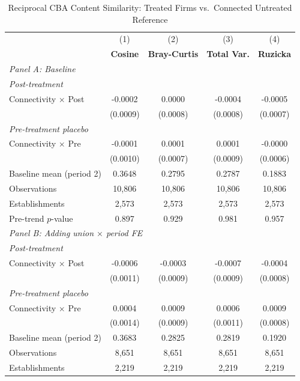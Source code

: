 \begin{table}[H]
\centering
\caption{Reciprocal CBA Content Similarity: Treated Firms vs.\ Connected Untreated Reference}
\label{tab:treated_cba_similarity}
\scriptsize
\setlength{\tabcolsep}{8pt}
\begin{tabular}{lcccc}
\toprule\toprule
 & (1) & (2) & (3) & (4) \\
 & \textbf{Cosine} & \textbf{Bray-Curtis} & \textbf{Total Var.} & \textbf{Ruzicka} \\
\midrule
\multicolumn{5}{l}{\textit{Panel A: Baseline}} \\
\multicolumn{5}{l}{\textit{Post-treatment}} \\
Connectivity $\times$ Post & -0.0002 & 0.0000 & -0.0004 & -0.0005 \\
 & (0.0009) & (0.0008) & (0.0008) & (0.0007) \\
\multicolumn{5}{l}{\textit{Pre-treatment placebo}} \\
Connectivity $\times$ Pre & -0.0001 & 0.0001 & 0.0001 & -0.0000 \\
 & (0.0010) & (0.0007) & (0.0009) & (0.0006) \\
\midrule
Baseline mean (period 2) & 0.3648 & 0.2795 & 0.2787 & 0.1883 \\
Observations &       10,806 &       10,806 &       10,806 &       10,806 \\
Establishments &        2,573 &        2,573 &        2,573 &        2,573 \\
Pre-trend $p$-value & 0.897 & 0.929 & 0.981 & 0.957 \\
\midrule
\multicolumn{5}{l}{\textit{Panel B: Adding union $\times$ period FE}} \\
\multicolumn{5}{l}{\textit{Post-treatment}} \\
Connectivity $\times$ Post & -0.0006 & -0.0003 & -0.0007 & -0.0004 \\
 & (0.0011) & (0.0009) & (0.0009) & (0.0008) \\
\multicolumn{5}{l}{\textit{Pre-treatment placebo}} \\
Connectivity $\times$ Pre & 0.0004 & 0.0009 & 0.0006 & 0.0009 \\
 & (0.0014) & (0.0009) & (0.0011) & (0.0008) \\
\midrule
Baseline mean (period 2) & 0.3683 & 0.2825 & 0.2819 & 0.1920 \\
Observations &        8,651 &        8,651 &        8,651 &        8,651 \\
Establishments &        2,219 &        2,219 &        2,219 &        2,219 \\

\end{tabular}
\end{table}
